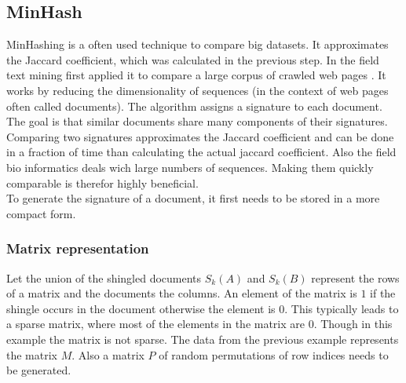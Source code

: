 \subsection{MinHash}
\label{ssec:minhash}

MinHashing is a often used technique to compare big datasets. It approximates the Jaccard coefficient, which was calculated in the previous step. In the field text mining \citeauthor{minhash} first applied it to compare a large corpus of crawled web pages \cite{minhash}. It works by reducing the dimensionality of sequences (in the context of web pages often called documents). The algorithm assigns a signature to each document. The goal is that similar documents share many components of  their signatures. Comparing two signatures approximates the Jaccard coefficient and can be done in a fraction of time than calculating the actual jaccard coefficient. Also the field bio informatics deals wich large numbers of sequences. Making them quickly comparable is therefor highly beneficial. \\

To generate the signature of a document, it first needs to be stored in a more compact form.

\subsubsection{Matrix representation}

Let the union of the shingled documents $ S_k(A) $ and $ S_k(B) $ represent the rows of a matrix and the documents the columns. An element of the matrix is $ 1 $ if the shingle occurs in the document otherwise the element is $ 0 $. This typically leads to a sparse matrix, where most of the elements in the matrix are $ 0 $. Though in this example the matrix is not sparse. The data from the previous example represents the matrix $ M $. Also a matrix $ P $ of random permutations of row indices needs to be generated.\\

